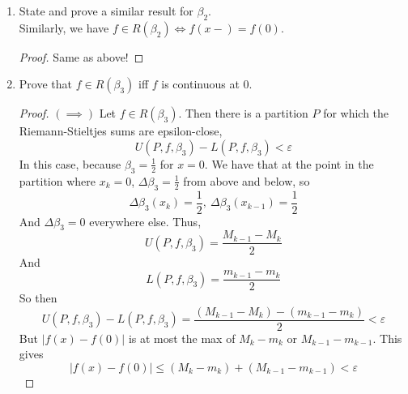 \documentclass[hidelinks,12pt]{article}
\renewcommand{\leq}{\leqslant}
\begin{document}
\begin{enumerate}
\begin{enumerate}[label=(\alph*).]
\begin{proof}
            and so \(f(x+)=f(0)\).\\
           \((\impliedby)\) Let \(f(x+)=f(0)\). Then we have for any \(\varepsilon>0\), there exists a \(\delta>0\) with \(|f(x)-f(0)|<\varepsilon\) when \(0<x<\delta\). Now consider a partition \(Q\) of \([-1,1]\) which contains a point \(x_{k}=0\). By the equality above, we have for \(x\in(0,\delta)\), that
\begin{align*}
|f(x)-f(0)|&\leq M_{k}-m_{k}\\
&=U(Q,f,\beta_{1})-L(Q,f,\beta_{1})\\
&<\varepsilon\\
\end{align*}
          And so the Riemann-Stieltjes sums are epsilon-close, which gives  
            \[
            \int f d \beta_{1}
            \]
            Exists, and equals \(f(0)\).
            \end{proof}
            \item State and prove a similar result for \(\beta_{2}\).\\
                Similarly, we have \(f\in R(\beta_{2})\iff f(x-)=f(0)\).
                \begin{proof}
                    Same as above!
                \end{proof}
            \item Prove that \(f\in R(\beta_{3})\) iff \(f\) is continuous at 0.
                \begin{proof}
                \((\implies)\) Let \(f\in R(\beta_{3})\). Then there is a partition \(P\) for which the Riemann-Stieltjes sums are epsilon-close, \[
                U(P,f,\beta_{3})-L(P,f,\beta_{3})<\varepsilon
                \]
               In this case, because \(\beta_{3}=\frac{1}{2}\) for \(x=0\). We have that at the point in the partition where \(x_{k}=0\), \(\Delta \beta_{3}=\frac{1}{2}\) from above and below, so
               \[
                   \Delta\beta_{3}(x_{k})=\frac{1}{2},\ \Delta\beta_{3}(x_{k-1})=\frac{1}{2}
               \]
               And \(\Delta \beta_{3}=0\) everywhere else. Thus, \[
               U(P,f,\beta_{3})=\frac{M_{k-1}-M_{k}}{2}
               \]
              And 
              \[
              L(P,f,\beta_{3})=\frac{m_{k-1}-m_{k}}{2}
              \]
             So then \[
                 U(P,f,\beta_{3})-L(P,f,\beta_{3})=\frac{(M_{k-1}-M_{k})-(m_{k-1}-m_{k})}{2}<\varepsilon
             \]
             But \(|f(x)-f(0)|\) is at most the max of \(M_{k}-m_{k}\) or \(M_{k-1}-m_{k-1}\). This gives \[
             |f(x)-f(0)|\leq (M_{k}-m_{k})+(M_{k-1}-m_{k-1})<\varepsilon
\]
\end{proof}
\end{enumerate}
\end{enumerate}
\end{document}

